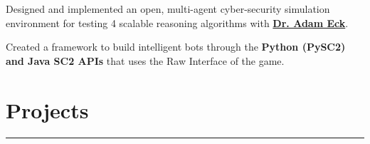 \documentclass[]{dafirebanks-resume-openfont}
\begin{document}
\begin{minipage}[t]{0.66\textwidth}
\hspace{150pt}
\begin{tightemize}
    \item Designed and implemented an open, multi-agent cyber-security simulation environment for testing 4 scalable reasoning algorithms with \textbf{\href{http://www.cs.oberlin.edu/~aeck/}{Dr. Adam Eck}}.
	\item Created a framework to build intelligent bots through the \textbf{Python (PySC2) and Java SC2 APIs} that uses the Raw Interface of the game. 
\end{tightemize}
\sectionsep





\section{Projects}
\vspace{-3pt}
{\color{blue}\hrule} \vspace{5pt}



\end{minipage}
\end{document}

